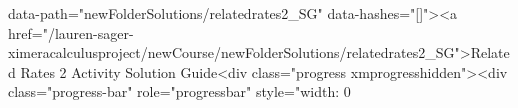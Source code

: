 data-path="newFolderSolutions/relatedrates2_SG" data-hashes="[]"><a href="/lauren-sager-ximeracalculusproject/newCourse/newFolderSolutions/relatedrates2_SG">Related Rates 2 Activity Solution Guide<div class="progress xmprogresshidden"><div class="progress-bar" role="progressbar" style="width: 0%